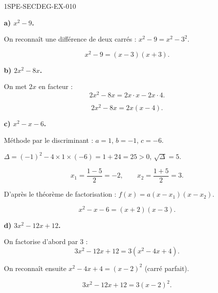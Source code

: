 \begin{corrige}{1SPE-SECDEG-EX-010}

\textbf{a) $x^2 - 9$.}


On reconnaît une différence de deux carrés : $x^2 - 9 = x^2 - 3^2$.

\[\boxed{x^2 - 9 = (x-3)(x+3).}\]

\medskip
\textbf{b) $2x^2 - 8x$.}


On met $2x$ en facteur :
\[2x^2 - 8x = 2x \cdot x - 2x \cdot 4.\]

\[\boxed{2x^2 - 8x = 2x(x - 4).}\]

\medskip
\textbf{c) $x^2 - x - 6$.}


Méthode par le discriminant : $a = 1$, $b = -1$, $c = -6$.

$\Delta = (-1)^2 - 4 \times 1 \times (-6) = 1 + 24 = 25 > 0$, $\sqrt{\Delta} = 5$.

\[x_1 = \frac{1 - 5}{2} = -2, \qquad x_2 = \frac{1 + 5}{2} = 3.\]

D'après le théorème de factorisation : $f(x) = a(x - x_1)(x - x_2)$.

\[\boxed{x^2 - x - 6 = (x + 2)(x - 3).}\]

\medskip
\textbf{d) $3x^2 - 12x + 12$.}


On factorise d'abord par $3$ :
\[3x^2 - 12x + 12 = 3(x^2 - 4x + 4).\]

On reconnaît ensuite $x^2 - 4x + 4 = (x-2)^2$ (carré parfait).

\[\boxed{3x^2 - 12x + 12 = 3(x-2)^2.}\]

\end{corrige}
